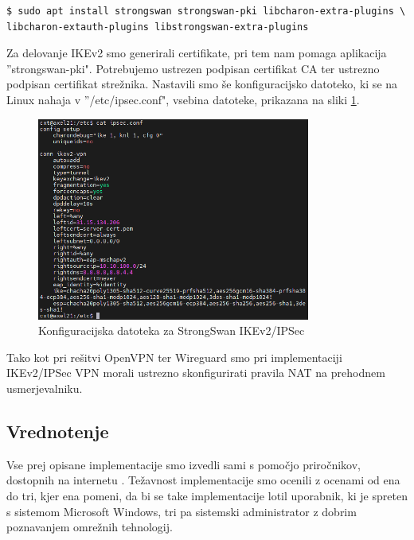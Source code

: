 \documentclass[a4paper, 12pt]{book}
\begin{document}
\begin{verbatim}
$ sudo apt install strongswan strongswan-pki libcharon-extra-plugins \
libcharon-extauth-plugins libstrongswan-extra-plugins
\end{verbatim}

Za delovanje IKEv2 smo generirali certifikate, pri tem nam pomaga aplikacija ''strongswan-pki". Potrebujemo ustrezen podpisan certifikat CA ter ustrezno podpisan certifikat strežnika. Nastavili smo še konfiguracijsko datoteko, ki se na Linux nahaja v ''/etc/ipsec.conf", vsebina datoteke, prikazana na sliki \ref{ipsec_conf}.

\begin{figure}[h]
\begin{center}
\includegraphics[width=0.8\textwidth]{fotografije/ipsec_conf.png}
\end{center}
\caption{Konfiguracijska datoteka za StrongSwan IKEv2/IPSec \cite{rvidmar}}
\label{ipsec_conf}
\end{figure}

Tako kot pri rešitvi OpenVPN ter Wireguard smo pri implementaciji IKEv2/IPSec VPN morali ustrezno skonfigurirati pravila NAT na prehodnem usmerjevalniku.

\subsection{Vrednotenje}
Vse prej opisane implementacije smo izvedli sami s pomočjo priročnikov, dostopnih na internetu \cite{tholstorf_ZeroTier_nodate,jan_just_keijser_openvpn_2017,noauthor_how_nodate-1,donenfeld_quick_nodate,noauthor_how_nodate}. Težavnost implementacije smo ocenili z ocenami od ena do tri, kjer ena pomeni, da bi se take implementacije lotil uporabnik, ki je spreten s sistemom Microsoft Windows, tri pa sistemski administrator z dobrim poznavanjem omrežnih tehnologij.
\end{document}
